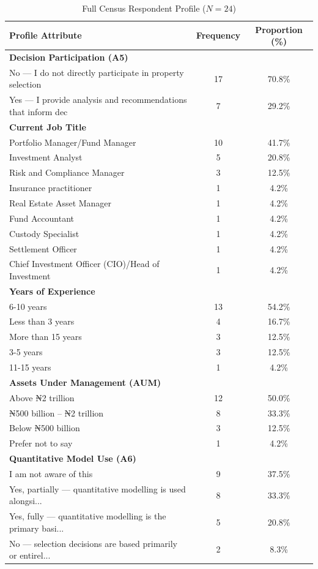 \begin{table}[htbp]
\centering
\caption{Full Census Respondent Profile ($N=24$)}
\label{tab:respondent_profile}
\begin{tabular}{lcc}
\hline
\textbf{Profile Attribute} & \textbf{Frequency} & \textbf{Proportion (\%)} \\
\hline
\multicolumn{3}{l}{\textbf{Decision Participation (A5)}} \\
No — I do not directly participate in property selection & 17 & 70.8\% \\
Yes — I provide analysis and recommendations that inform dec & 7 & 29.2\% \\
\hline
\multicolumn{3}{l}{\textbf{Current Job Title}} \\
Portfolio Manager/Fund Manager & 10 & 41.7\% \\
Investment Analyst & 5 & 20.8\% \\
Risk and Compliance Manager & 3 & 12.5\% \\
Insurance practitioner  & 1 & 4.2\% \\
Real Estate Asset Manager  & 1 & 4.2\% \\
Fund Accountant & 1 & 4.2\% \\
Custody Specialist  & 1 & 4.2\% \\
Settlement Officer  & 1 & 4.2\% \\
Chief Investment Officer (CIO)/Head of Investment & 1 & 4.2\% \\
\hline
\multicolumn{3}{l}{\textbf{Years of Experience}} \\
6-10 years & 13 & 54.2\% \\
Less than 3 years & 4 & 16.7\% \\
More than 15 years & 3 & 12.5\% \\
3-5 years & 3 & 12.5\% \\
11-15 years & 1 & 4.2\% \\
\hline
\multicolumn{3}{l}{\textbf{Assets Under Management (AUM)}} \\
Above ₦2 trillion & 12 & 50.0\% \\
₦500 billion – ₦2 trillion & 8 & 33.3\% \\
Below ₦500 billion & 3 & 12.5\% \\
Prefer not to say & 1 & 4.2\% \\
\hline
\multicolumn{3}{l}{\textbf{Quantitative Model Use (A6)}} \\
I am not aware of this & 9 & 37.5\% \\
Yes, partially — quantitative modelling is used alongsi... & 8 & 33.3\% \\
Yes, fully — quantitative modelling is the primary basi... & 5 & 20.8\% \\
No — selection decisions are based primarily or entirel... & 2 & 8.3\% \\
\hline
\end{tabular}
\end{table}

